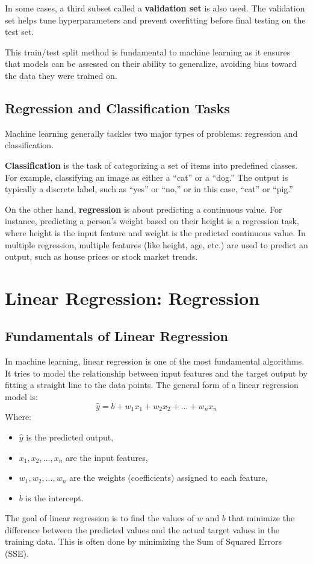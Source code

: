 In some cases, a third subset called a \textbf{validation set} is also used. The validation set helps tune hyperparameters and prevent overfitting before final testing on the test set.

This train/test split method is fundamental to machine learning as it ensures that models can be assessed on their ability to generalize, avoiding bias toward the data they were trained on.
\subsection{Regression and Classification Tasks}
    \large Machine learning generally tackles two major types of problems: regression and classification.
    
    \textbf{Classification} is the task of categorizing a set of items into predefined classes. For example, classifying an image as either a “cat” or a “dog.” The output is typically a discrete label, such as “yes” or “no,” or in this case, “cat” or “pig.”
    
    On the other hand, \textbf{regression} is about predicting a continuous value. For instance, predicting a person’s weight based on their height is a regression task, where height is the input feature and weight is the predicted continuous value. In multiple regression, multiple features (like height, age, etc.) are used to predict an output, such as house prices or stock market trends.

\section{Linear Regression: Regression}
\subsection{Fundamentals of Linear Regression}
    \large In machine learning, linear regression is one of the most fundamental algorithms. It tries to model the relationship between input features and the target output by fitting a straight line to the data points. The general form of a linear regression model is:
        $$\hat{y} = b + w_1x_1 + w_2x_2 + ... + w_nx_n$$
    Where:
    \begin{itemize}
        \item \( \hat{y} \) is the predicted output,
        \item \( x_1, x_2, ..., x_n \) are the input features,
        \item \( w_1, w_2, ..., w_n \) are the weights (coefficients) assigned to each feature,
        \item \( b \) is the intercept.
    \end{itemize}
    The goal of linear regression is to find the values of \( w \) and \( b \) that minimize the difference between the predicted values and the actual target values in the training data. This is often done by minimizing the Sum of Squared Errors (SSE).
